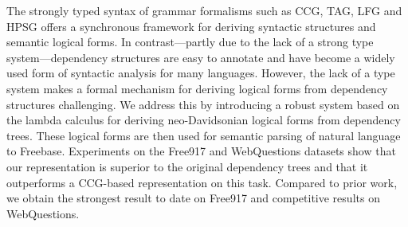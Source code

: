 The strongly typed syntax of grammar formalisms such as CCG, TAG, LFG and HPSG offers a synchronous framework for deriving syntactic structures and semantic logical forms.  In contrast---partly due to the lack of a strong type system---dependency structures are easy to annotate and have become a widely used form of syntactic analysis for many languages.  However, the lack of a type system makes a formal mechanism for deriving logical forms from dependency structures challenging.  We address this by introducing a robust system based on the lambda calculus for deriving neo-Davidsonian logical forms from dependency trees. These logical forms are then used for semantic parsing of natural language to Freebase. Experiments on the Free917 and WebQuestions datasets show that our representation is superior to the original dependency trees and that it outperforms a CCG-based representation on this task. Compared to prior work, we obtain the strongest result to date on Free917 and competitive results on WebQuestions.